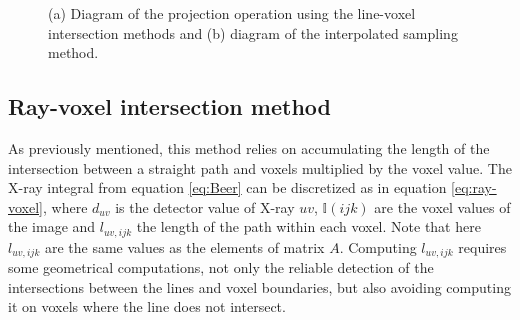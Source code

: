 \begin{figure}

\begin{center} 
 
\caption[Diagram of projection types]{\label{fig:Amatrix}(a) Diagram of the projection operation using the line-voxel intersection methods and (b) diagram of the interpolated sampling method.} 
\end{center} 
\end{figure}

\FloatBarrier

\subsection{Ray-voxel intersection method}

As previously mentioned, this method relies on accumulating the length of the intersection between a straight path and voxels multiplied by the voxel value. The X-ray integral from equation \ref{eq:Beer} can be discretized as in equation \ref{eq:ray-voxel}, where $d_{uv}$ is the detector value of X-ray $uv$, $\mathbb{I}(ijk)$ are the voxel values of the image and $l_{uv,ijk}$ the length of the path within each voxel. Note that here $l_{uv,ijk}$ are the same values as the elements of matrix $A$. Computing $l_{uv,ijk}$ requires some geometrical computations, not only the reliable detection of the intersections between the lines and voxel boundaries, but also avoiding computing it on voxels where the line does not intersect.

